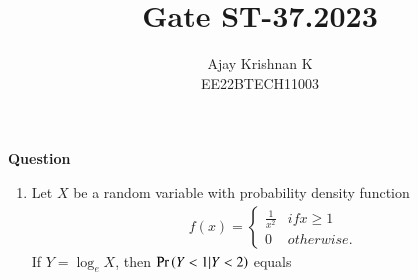 \documentclass[journal,11pt]{IEEEtran}
\begin{document}
\vspace{3cm}
\author{Ajay Krishnan K\\EE22BTECH11003}

\title{Gate ST-37.2023}
\maketitle

\textbf{Question}
\begin{enumerate}
\item Let $X$ be a random variable with probability density function
\begin{align}\
    f(x) = \begin{cases}
               \frac{1}{x^2} & if x \geq 1 \\
               0             & otherwise.
           \end{cases}
\end{align}
If $Y = \log_e X$, then $\Pr\left(Y<1 | Y<2 \right)$ equals



\end{enumerate}
\end{document}
